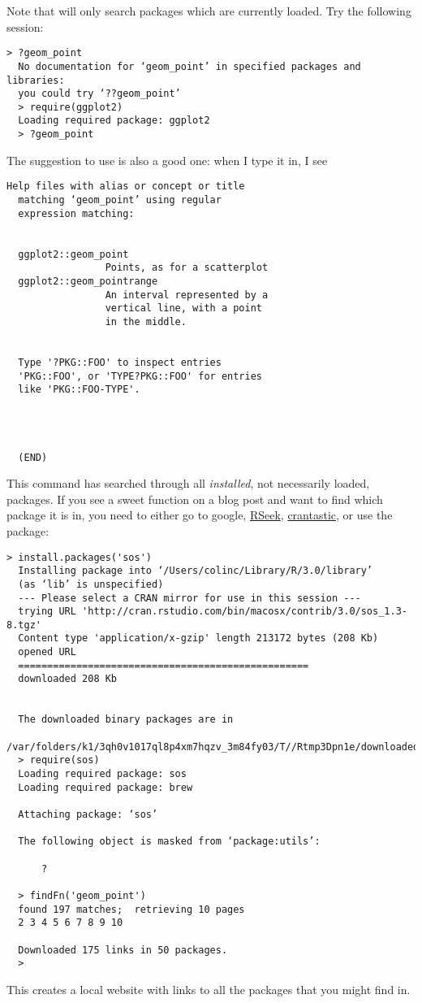 \begin{description}
  Note that  will only search packages which are currently loaded.  
  Try the following session:

  \begin{lstlisting}[style=bash]
  > ?geom_point
  No documentation for ‘geom_point’ in specified packages and libraries:
  you could try ‘??geom_point’
  > require(ggplot2)
  Loading required package: ggplot2
  > ?geom_point 
  \end{lstlisting}

  The suggestion to use  is also a good one: when I type it in, I see

  \begin{lstlisting}[style=bash]
  Help files with alias or concept or title
  matching ‘geom_point’ using regular
  expression matching:


  ggplot2::geom_point
                 Points, as for a scatterplot
  ggplot2::geom_pointrange
                 An interval represented by a
                 vertical line, with a point
                 in the middle.


  Type '?PKG::FOO' to inspect entries
  'PKG::FOO', or 'TYPE?PKG::FOO' for entries
  like 'PKG::FOO-TYPE'.




  (END) 
  \end{lstlisting}
  This command has searched through all \emph{installed}, not necessarily loaded,
  packages.  If you see a sweet function on a blog post and want to find which 
  package it is in, you need to either go to google,
  \href{http://www.rseek.org/}{RSeek},
  \href{http://crantastic.org/}{crantastic},
  or use the  package:

  \begin{lstlisting}[style=bash]
  > install.packages('sos')
  Installing package into ‘/Users/colinc/Library/R/3.0/library’
  (as ‘lib’ is unspecified)
  --- Please select a CRAN mirror for use in this session ---
  trying URL 'http://cran.rstudio.com/bin/macosx/contrib/3.0/sos_1.3-8.tgz'
  Content type 'application/x-gzip' length 213172 bytes (208 Kb)
  opened URL
  ==================================================
  downloaded 208 Kb


  The downloaded binary packages are in
    /var/folders/k1/3qh0v1017ql8p4xm7hqzv_3m84fy03/T//Rtmp3Dpn1e/downloaded_packages
  > require(sos)
  Loading required package: sos
  Loading required package: brew

  Attaching package: ‘sos’

  The following object is masked from ‘package:utils’:

      ?

  > findFn('geom_point')
  found 197 matches;  retrieving 10 pages
  2 3 4 5 6 7 8 9 10 

  Downloaded 175 links in 50 packages.
  >
  \end{lstlisting}

This creates a local website with links to all the packages that you might find
 in.  

\end{description}


